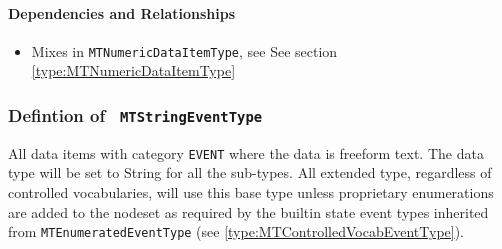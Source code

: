 \paragraph{Dependencies and Relationships}

\begin{itemize}
\item Mixes in \texttt{MTNumericDataItemType}, see See section \ref{type:MTNumericDataItemType}
\end{itemize}
\FloatBarrier
\subsubsection{Defintion of \texttt{ MTStringEventType}}
  \label{type:MTStringEventType}

\FloatBarrier

All data items with category \texttt{EVENT} where the data is freeform text. The data type
will be set to String for all the sub-types. All extended type, regardless of 
controlled vocabularies, will use this base type unless proprietary 
enumerations are added to the nodeset as required by the builtin state
event types inherited from \texttt{MTEnumeratedEventType} (see \ref{type:MTControlledVocabEventType}).


